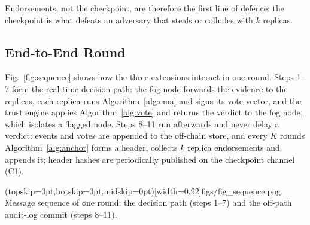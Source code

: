 Endorsements, not the checkpoint, are therefore the first line of
defence; the checkpoint is what defeats an adversary that steals or
colludes with $k$ replicas.

\subsection{End-to-End Round}
\label{sec:round}
Fig.~\ref{fig:sequence} shows how the three extensions interact in one
round.  Steps 1--7 form the real-time decision path: the fog node
forwards the evidence to the replicas, each replica runs
Algorithm~\ref{alg:ema} and signs its vote vector, and the trust engine
applies Algorithm~\ref{alg:vote} and returns the verdict to the fog
node, which isolates a flagged node.  Steps 8--11 run afterwards and
never delay a verdict: events and votes are appended to the off-chain
store, and every $K$ rounds Algorithm~\ref{alg:anchor} forms a header,
collects $k$ replica endorsements and appends it; header hashes are
periodically published on the checkpoint channel (C1).

\Figure[!t](topskip=0pt,botskip=0pt,midskip=0pt)[width=0.92\textwidth]{figs/fig_sequence.png}
{Message sequence of one round: the decision path (steps 1--7) and the off-path audit-log commit (steps 8--11).\label{fig:sequence}}

